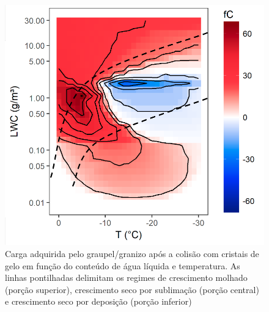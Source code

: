 \begin{figure}[hp]
	\begin{center}
		\caption{Carga adquirida pelo graupel/granizo após a colisão com cristais de gelo em função do conteúdo de água líquida e temperatura. As linhas pontilhadas delimitam os regimes de crescimento molhado (porção superior), crescimento seco por sublimação (porção central) e crescimento seco por deposição (porção inferior)} 
		\label{takahashi}
		\includegraphics[width=0.6\columnwidth]{figs/takahashi_williams_notitle.png}
	\end{center}
\end{figure}


